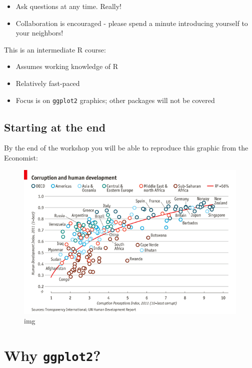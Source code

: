 \documentclass[]{book}
\providecommand{\tightlist}{%
  \setlength{\itemsep}{0pt}\setlength{\parskip}{0pt}}
\begin{document}
\begin{itemize}
\tightlist
\item
  Ask questions at any time. Really!
\item
  Collaboration is encouraged - please spend a minute introducing
  yourself to your neighbors!
\end{itemize}

This is an intermediate R course:

\begin{itemize}
\tightlist
\item
  Assumes working knowledge of R
\item
  Relatively fast-paced
\item
  Focus is on \texttt{ggplot2} graphics; other packages will not be
  covered
\end{itemize}

\subsection{Starting at the end}\label{starting-at-the-end}

By the end of the workshop you will be able to reproduce this graphic
from the Economist:

\begin{figure}
\centering
\includegraphics{R/Rgraphics/images/Economist1.png}
\caption{img}
\end{figure}

\section{\texorpdfstring{Why
\texttt{ggplot2}?}{Why ggplot2?}}\label{why-ggplot2}
\end{document}

